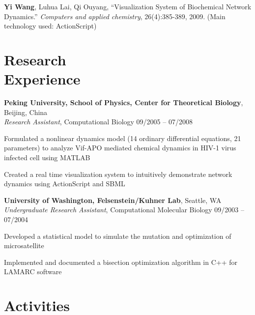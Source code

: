 \documentclass[margin,line]{resume}
\begin{document}
\begin{resume}
      \textbf{Yi Wang}, Luhua Lai, Qi Ouyang, ``Visualization System of Biochemical Network Dynamics.''
      \textsl{Computers and applied chemistry}, 26(4):385-389, 2009. (Main technology used: ActionScript)

    \section{\mysidestyle Research \\ Experience}

    \textbf{Peking University, School of Physics, Center for Theoretical Biology}, Beijing, China \\
    \textsl{Research Assistant}, Computational Biology \hfill 09/2005 -- 07/2008 \vspace{-3mm}\\\vspace{-1mm}%
      \begin{list2}
      \item Formulated a nonlinear dynamics model (14 ordinary differential equations, 21 parameters) to analyze Vif-APO mediated chemical dynamics in HIV-1 virus infected cell using MATLAB
      \item Created a real time visualization system to intuitively demonstrate network dynamics using ActionScript and SBML 
      \end{list2}

    \textbf{University of Washington, Felsenstein/Kuhner Lab}, Seattle, WA \\
    \textsl{Undergraduate Research Assistant}, Computational Molecular Biology \hfill 09/2003 -- 07/2004  \vspace{-3mm}\\\vspace{-1mm}%
      \begin{list2}
      \item Developed a statistical model to simulate the mutation and optimization of microsatellite 
      \item Implemented and documented a bisection optimization algorithm in C++ for LAMARC software 
      \end{list2}
      
    \section{\mysidestyle Activities}


\end{resume}
\end{document}
